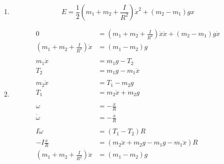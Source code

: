 \documentclass{article}
\begin{document}
\begin{enumerate}
  \item \[E = \frac{1}{2} \left( m_1 + m_2 + \frac{I}{R^2} \right) \dot{x}^2 + (m_2 - m_1) g x\]

  \item

        \begin{align*}
          0                                                 & = \left( m_1 + m_2 + \frac{I}{R^2} \right) \dot{x} \ddot{x} + (m_2 - m_1) g \dot{x} \\
          \left( m_1 + m_2 + \frac{I}{R^2} \right) \ddot{x} & = (m_1 - m_2) g                                                                     \\ \\
          m_1 \ddot{x}                                      & = m_1 g - T_2                                                                       \\
          T_2                                               & = m_1 g - m_1 \ddot{x}                                                              \\ \\
          m_2 \ddot{x}                                      & = T_1 - m_2 g                                                                       \\
          T_1                                               & = m_2 \ddot{x} + m_2 g                                                              \\ \\
          \omega                                            & = -\frac{\dot{x}}{R}                                                                \\
          \dot{\omega}                                      & = -\frac{\ddot{x}}{R}                                                               \\ \\
          I \dot{\omega}                                    & = (T_1 - T_2) R                                                                     \\
          -I \frac{\ddot{x}}{R}                             & = \left( m_2 \ddot{x} + m_2 g - m_1 g - m_1 \ddot{x} \right) R                      \\
          \left( m_1 + m_2 + \frac{I}{R^2} \right) \ddot{x} & = (m_1 - m_2) g
        \end{align*}
\end{enumerate}
\end{document}
